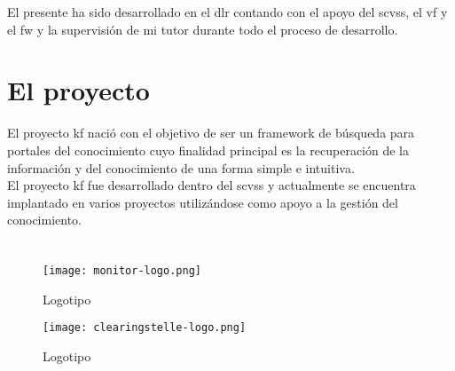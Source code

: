 
\begin{comment}
A continuación, se describe la motivación del presente proyecto y su alcance. También se incluye un glosario de términos y la organización del resto de la presente documentación.
\end{comment}

\label{chapter:introduccinon}

El presente \pfc{} ha sido desarrollado en el \gls{dlr} contando con el apoyo del \gls{scvss}, el \gls{vf} y el \gls{fw} y la supervisión de mi tutor \profname{} durante todo el proceso de desarrollo.

% 

\section{El proyecto \kf}
\label{section:kf}
El proyecto \gls{kf} nació con el objetivo de ser un \gls{framework} de búsqueda para portales del conocimiento cuyo finalidad principal es la recuperación de la información y del conocimiento de una forma simple e intuitiva.\\

El proyecto \gls{kf} fue desarrollado dentro del \gls{scvss} y  actualmente se encuentra implantado en varios proyectos utilizándose como apoyo a la gestión del conocimiento.


\section{}

\begin{wrapfigure}{r}{0.3\textwidth}
  \begin{center}
    \texttt{[image: monitor-logo.png]}
  \end{center}
  \caption{Logotipo \mo}

  \begin{center}
    \texttt{[image: clearingstelle-logo.png]}
  \end{center}
  \caption{Logotipo \cs}
\end{wrapfigure}

